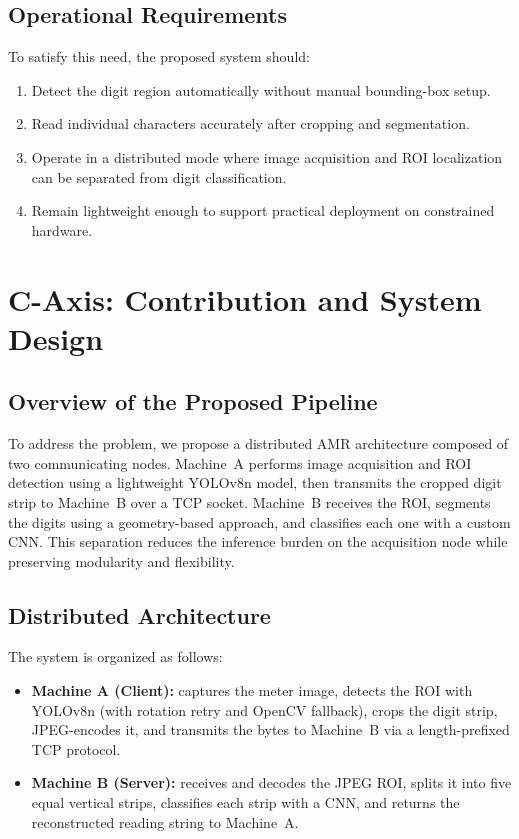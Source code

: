 \documentclass[11pt,a4paper]{article}
\begin{document}
\subsection{Operational Requirements}
To satisfy this need, the proposed system should:
\begin{enumerate}[label=\arabic*.]
    \item Detect the digit region automatically without manual bounding-box setup.
    \item Read individual characters accurately after cropping and segmentation.
    \item Operate in a distributed mode where image acquisition and ROI localization can be separated from digit classification.
    \item Remain lightweight enough to support practical deployment on constrained hardware.
\end{enumerate}

\section{C-Axis: Contribution and System Design}

\subsection{Overview of the Proposed Pipeline}
To address the problem, we propose a distributed AMR architecture composed of two communicating nodes. Machine~A performs image acquisition and ROI detection using a lightweight YOLOv8n model, then transmits the cropped digit strip to Machine~B over a TCP socket. Machine~B receives the ROI, segments the digits using a geometry-based approach, and classifies each one with a custom CNN. This separation reduces the inference burden on the acquisition node while preserving modularity and flexibility.

\subsection{Distributed Architecture}
The system is organized as follows:
\begin{itemize}
    \item \textbf{Machine A (Client):} captures the meter image, detects the ROI with YOLOv8n (with rotation retry and OpenCV fallback), crops the digit strip, JPEG-encodes it, and transmits the bytes to Machine~B via a length-prefixed TCP protocol.
    \item \textbf{Machine B (Server):} receives and decodes the JPEG ROI, splits it into five equal vertical strips, classifies each strip with a CNN, and returns the reconstructed reading string to Machine~A.
\end{itemize}
\end{document}
